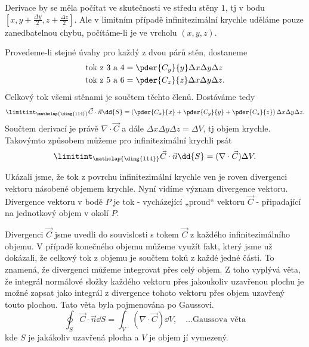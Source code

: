     Derivace by se měla počítat ve skutečnosti ve středu stěny $1$, tj v bodu $[x, y+\frac{\Delta 
    y}{2}, z + \frac{\Delta z}{2}]$. Ale v limitním případě infinitezimální krychle uděláme pouze 
    zanedbatelnou chybu, počítáme-li je ve vrcholu $(x,y,z)$.
    
    Provedeme-li stejné úvahy pro každý z dvou párů stěn, dostaneme    
    \begin{align*}
     \text{tok z 3 a 4} &= \pder{C_y}{y}\Delta x\Delta y\Delta z   \\ 
     \text{tok z 5 a 6} &= \pder{C_z}{z}\Delta x\Delta y\Delta z.
    \end{align*}       
    Celkový tok všemi stěnami je součtem těchto členů. Dostáváme tedy
    \begin{equation}
     \limitint_{\mathclap{\substack{\text{\ding{114}}}}}\vec{C}\cdot\vec{n}\dd{S}
        = \left(\pder{C_x}{x}+\pder{C_y}{y} +
          \pder{C_z}{z}\right)\Delta x\Delta y \Delta z.
    \end{equation}
    Součtem derivací je právě $\nabla\cdot\vec{C}$ a dále $\Delta x\Delta y \Delta z = \Delta V$, 
    tj objem krychle. Takovýmto způsobem můžeme pro infinitezimální krychli psát
    \begin{equation}
      \limitint_{\mathclap{\substack{\text{\ding{114}}}}}\vec{C}\cdot\vec{n}\dd{S}
       = (\nabla\cdot\vec{C})\Delta V.       \label{fyz:eq_gauss1}
    \end{equation}
    
    Ukázali jsme, že tok z povrchu infinitezimální krychle ven je roven divergenci vektoru násobené 
    objemem krychle. Nyní vidíme význam divergence vektoru. Divergence vektoru v bodě \(P\) je tok 
    - vycházející „proud“ vektoru $\vec{C}$ - připadající na jednotkový objem v okolí \(P\).
    
    Divergenci \(\vec{C}\) jsme uvedli do souvislosti s tokem \(\vec{C}\) z každého 
    infinitezimálního objemu. V případě konečného objemu můžeme využít fakt, který jsme už 
    dokázali, že celkový tok z objemu je součtem toků z každé jedné části. To znamená, že 
    divergenci můžeme integrovat přes celý objem. Z toho vyplývá věta, že integrál normálové složky 
    každého vektoru přes jakoukoliv uzavřenou plochu je možné zapsat jako integrál z divergence 
    tohoto vektoru přes objem uzavřený touto plochou. Tato věta byla pojmenována po Gaussovi.
    \begin{equation}\label{fyz:eq_gauss_veta}
     \oint_S \vec{C}\cdot\vec{n}\dd{S} 
       = \int_V (\nabla\cdot\vec{C})\dd{V}, \quad\ldots\text{Gaussova věta}
    \end{equation}
    kde $S$ je jakákoliv uzavřená plocha a $V$ je objem jí vymezený.
    
